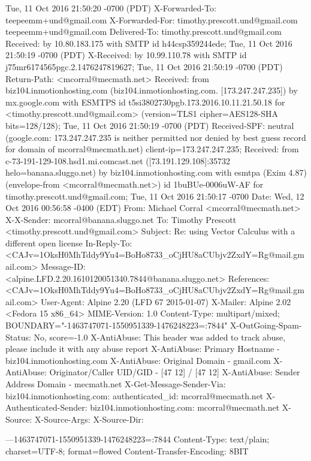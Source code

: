 \begin{itemize}
\begin{itemize}
        Tue, 11 Oct 2016 21:50:20 -0700 (PDT)
X-Forwarded-To: teepeemm+und@gmail.com
X-Forwarded-For: timothy.prescott.und@gmail.com teepeemm+und@gmail.com
Delivered-To: timothy.prescott.und@gmail.com
Received: by 10.80.183.175 with SMTP id h44csp359244ede;
        Tue, 11 Oct 2016 21:50:19 -0700 (PDT)
X-Received: by 10.99.110.78 with SMTP id j75mr6174565pgc.2.1476247819627;
        Tue, 11 Oct 2016 21:50:19 -0700 (PDT)
Return-Path: <mcorral@mecmath.net>
Received: from biz104.inmotionhosting.com (biz104.inmotionhosting.com. [173.247.247.235])
        by mx.google.com with ESMTPS id t5si3802730pgb.173.2016.10.11.21.50.18
        for <timothy.prescott.und@gmail.com>
        (version=TLS1 cipher=AES128-SHA bits=128/128);
        Tue, 11 Oct 2016 21:50:19 -0700 (PDT)
Received-SPF: neutral (google.com: 173.247.247.235 is neither permitted nor denied by best guess record for domain of mcorral@mecmath.net) client-ip=173.247.247.235;
Received: from c-73-191-129-108.hsd1.mi.comcast.net ([73.191.129.108]:35732 helo=banana.sluggo.net) by biz104.inmotionhosting.com with esmtpa (Exim 4.87) (envelope-from <mcorral@mecmath.net>) id 1buBUe-0006uW-AF for timothy.prescott.und@gmail.com; Tue, 11 Oct 2016 21:50:17 -0700
Date: Wed, 12 Oct 2016 00:56:58 -0400 (EDT)
From: Michael Corral <mcorral@mecmath.net>
X-X-Sender: mcorral@banana.sluggo.net
To: Timothy Prescott <timothy.prescott.und@gmail.com>
Subject: Re: using Vector Calculus with a different open license
In-Reply-To: <CAJv=1OksH0MhTddy9Yu4=BoHo8733_oCjHU8aCUbjv2ZxdY=Rg@mail.gmail.com>
Message-ID: <alpine.LFD.2.20.1610120051340.7844@banana.sluggo.net>
References: <CAJv=1OksH0MhTddy9Yu4=BoHo8733_oCjHU8aCUbjv2ZxdY=Rg@mail.gmail.com>
User-Agent: Alpine 2.20 (LFD 67 2015-01-07)
X-Mailer: Alpine 2.02 <Fedora 15 x86_64>
MIME-Version: 1.0
Content-Type: multipart/mixed; BOUNDARY="-1463747071-1550951339-1476248223=:7844"
X-OutGoing-Spam-Status: No, score=-1.0
X-AntiAbuse: This header was added to track abuse, please include it with any abuse report
X-AntiAbuse: Primary Hostname - biz104.inmotionhosting.com
X-AntiAbuse: Original Domain - gmail.com
X-AntiAbuse: Originator/Caller UID/GID - [47 12] / [47 12]
X-AntiAbuse: Sender Address Domain - mecmath.net
X-Get-Message-Sender-Via: biz104.inmotionhosting.com: authenticated_id: mcorral@mecmath.net
X-Authenticated-Sender: biz104.inmotionhosting.com: mcorral@mecmath.net
X-Source: 
X-Source-Args: 
X-Source-Dir: 

---1463747071-1550951339-1476248223=:7844
Content-Type: text/plain; charset=UTF-8; format=flowed
Content-Transfer-Encoding: 8BIT


\end{itemize}
\end{itemize}
